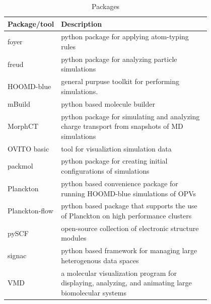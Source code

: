 \begin{table}[ht]
    \caption{Packages} %
\centering %
\begin{tabular}{|l|p{0.8\linewidth}|} %
\hline\hline %
Package/tool & Description \\ [0.5ex] %
\hline %
    foyer & python package for applying atom-typing rules  \cite{Klein2018a}\\ [1ex] %
freud & python package for analyzing particle simulations  \cite{Ramasubramani2020}\\ [1ex] %
HOOMD-blue & general purpuse toolkit for performing simulations.   \cite{Anderson2020a}\\ [1ex] %
    mBuild & python based molecule builder \cite{Klein2018a}\\ [1ex] %
MorphCT & python package for simulating and analyzing charge transport from 
    snapshots of MD simulations \cite{jones2017}\cite{cmelab}\\[1ex] 
OVITO basic & tool for visualiztion simulation data \cite{Stukowski2010a}\\[1ex] 
packmol & python package for creating initial configurations of simulations \cite{Martinez2009}\\[1ex] 
Planckton & python based convenience package for running HOOMD-blue
    simulations of OPVs \cite{cmelab}\\[1ex]
Planckton-flow & python based package that supports the use of Planckton on
    high performance clusters\cite{cmelab}\\[1ex]
pySCF & open-source collection of electronic structure modules \cite{Sun2018a}\\[1ex]
signac & python based framework for managing large heterogenous data spaces \cite{Adorf2016}\\[1ex]
VMD & a molecular visualization program for displaying, analyzing, and animating large biomolecular
    systems \cite{Humphrey1996}\\

\hline %
\end{tabular}
\label{packages} %
\end{table}


